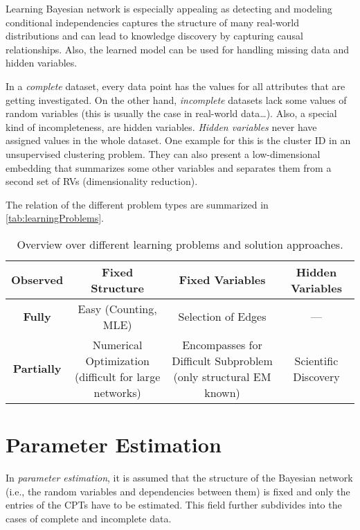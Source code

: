 	Learning Bayesian network is especially appealing as detecting and modeling conditional independencies captures the structure of many real-world distributions and can lead to knowledge discovery by capturing causal relationships. Also, the learned model can be used for handling missing data and hidden variables.

	In a \emph{complete} dataset, every data point has the values for all attributes that are getting investigated. On the other hand, \emph{incomplete} datasets lack some values of random variables (this is usually the case in real-world data\dots). Also, a special kind of incompleteness, are hidden variables. \emph{Hidden variables} never have assigned values in the whole dataset. One example for this is the cluster ID in an unsupervised clustering problem. They can also present a low-dimensional embedding that summarizes some other variables and separates them from a second set of RVs (dimensionality reduction).

	The relation of the different problem types are summarized in \autoref{tab:learningProblems}.

	\begin{table}
		\centering
		\begin{tabular}{c|ccc}
			\toprule
			\textbf{Observed}  & \textbf{Fixed Structure}                                            & \textbf{Fixed Variables}                                                      & \textbf{Hidden Variables}          \\ \midrule
			\textbf{Fully}     & Easy (Counting, MLE)                                                & Selection of Edges                                                            & ---                                \\
			\textbf{Partially} & \makecell{Numerical Optimization \\ (difficult for large networks)} & \makecell{Encompasses for Difficult Subproblem \\ (only structural EM known)} & \makecell{Scientific \\ Discovery} \\ \bottomrule
		\end{tabular}
		\caption[Overview Over Different Learning Problems]{Overview over different learning problems and solution approaches.}
		\label{tab:learningProblems}
	\end{table}

	\section{Parameter Estimation}
		In \emph{parameter estimation}, it is assumed that the structure of the Bayesian network (i.e., the random variables and dependencies between them) is fixed and only the entries of the CPTs have to be estimated. This field further subdivides into the cases of complete and incomplete data.

